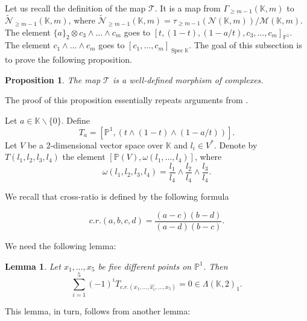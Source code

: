 \documentclass[12pt]{extarticle}
\newtheorem{lemma}[theorem]{Lemma}
\newtheorem{proposition}[theorem]{Proposition}
\def\mb{\mathbb}
\def\mc{\mathcal}
\def\L{\Lambda}
\def\k{\mb K}
\def\wt{\widetilde}
\renewcommand{\P}{{\mb P}}
\def\wdw{\wedge\dots\wedge}
\def\bs{\backslash}
\def\T{\mc T}
\def\W{\mc W}
\def \tW{\wt{\W}}
\def \wW{\tW}
\def \CH{\mc{N}}
\def \wCH{\wt{\CH}_{\geq m-1}}
\def \wG{\Gamma_{\geq m-1}}
\def \M{\mc M}
\DeclareMathOperator{\spec}{Spec}
\begin{document}
Let us recall the definition of the map $\T$. It is a map from $\wG(\k,m)$ to $\wCH(\k,m)$, where $\wCH(\k,m)=\tau_{\geq m-1}(\CH(\k,m))/\M(\k,m)$. The element $\{a\}_2\otimes c_3\wdw c_{m}$ goes to 
$[t,(1-t),(1-a/t),c_3,\dots, c_{m}]_{\P^1}.$ The element $c_1\wdw c_m$ goes to
$[c_1,\dots, c_m]_{\spec\k}.$
The goal of this subsection is to prove the following proposition. 

\begin{proposition}
\label{prop:T_is_well_defined}
    The map $\T$ is a well-defined morphism of complexes.
\end{proposition}

The proof of this proposition essentially repeats arguments from \cite{cubical1999herbert}. %


Let $a\in \k\bs\{0\}$. Define
$$T_a = [\P^1, (t\wedge (1-t)\wedge (1-a/t))].$$
Let $V$ be a $2$-dimensional vector space over $\k$ and $l_i\in V^{*}$. Denote by $T(l_1, l_2, l_3, l_4)$ the element $[\P(V), \omega(l_1, \dots, l_4)]$, where $$\omega(l_1, l_2, l_3, l_4)=\dfrac {l_1}{l_4}\wedge \dfrac {l_2}{l_4}\wedge \dfrac {l_3}{l_4}.$$

We recall that cross-ratio is defined by the following formula 

$$c.r.(a,b,c,d)=\dfrac{(a-c)(b-d)}{(a-d)(b-c)}.$$

We need the following lemma:

\begin{lemma}
\label{lemma:Abel_five_term_relations}
    Let $x_1,\dots, x_5$ be five different points on $\mb \P^1$. Then
    $$\sum\limits_{i=1}^5(-1)^iT_{c.r.(x_1,\dots,\hat{x_i},\dots, x_5)}=0\in\L(\k,2)_{1}.$$
\end{lemma}

This lemma, in turn, follows from another lemma:
\end{document}
